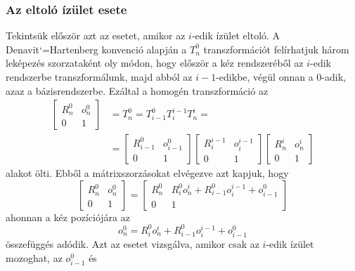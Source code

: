 \documentclass[12pt,a4paper]{report}
\theoremstyle{remark}
\theoremstyle{definition}
\begin{document}
\subsubsection{Az eltoló ízület esete}
Tekintsük először azt az esetet, amikor az $i$-edik ízület eltoló. A Denavit`=Hartenberg konvenció alapján
a $T^{0}_{n}$ transzformációt felírhatjuk három leképezés szorzataként oly módon, hogy először a kéz rendszeréből az 
$i$-edik rendszerbe transzformálunk, majd abból az $i-1$-edikbe, végül onnan a $0$-adik, azaz a bázisrendszerbe. 
Ezáltal a homogén transzformáció az
\begin{equation}
\begin{aligned}
\begin{bmatrix}
R^{0}_{n} & o^{0}_{n} \\ 
0 & 1
\end{bmatrix} &= T^{0}_{n} = T^{0}_{i-1} T^{i-1}_{i} T^{i}_{n} = \\
    &= \begin{bmatrix}
        R^{0}_{i-1} & o^{0}_{i-1} \\ 
        0 & 1
        \end{bmatrix}
        \begin{bmatrix}
        R^{i-1}_{i} & o^{i-1}_{i} \\ 
        0 & 1
        \end{bmatrix}
        \begin{bmatrix}
        R^{i}_{n} & o^{i}_{n} \\ 
        0 & 1
        \end{bmatrix}
\end{aligned}
\end{equation}
alakot ölti. Ebből a mátrixszorzásokat elvégezve azt kapjuk, hogy
\begin{equation}
\begin{bmatrix}
R^{0}_{n} & o^{0}_{n} \\ 
0 & 1
\end{bmatrix} = 
\begin{bmatrix}
R^{0}_{n} & R^{0}_{i}o^{i}_{n} + R^{0}_{i-1}o^{i-1}_{i} + o^{0}_{i-1} \\ 
0 & 1
\end{bmatrix}
\end{equation}
ahonnan a kéz pozíciójára az
\begin{equation} \label{eq:effectorpos}
o^{0}_{n} = R^{0}_{i}o^{i}_{n} + R^{0}_{i-1}o^{i-1}_{i} + o^{0}_{i-1}
\end{equation}
összefüggés adódik. Azt az esetet vizsgálva, amikor csak az $i$-edik ízület mozoghat, az $o^{0}_{i-1}$ és 
\end{document}
